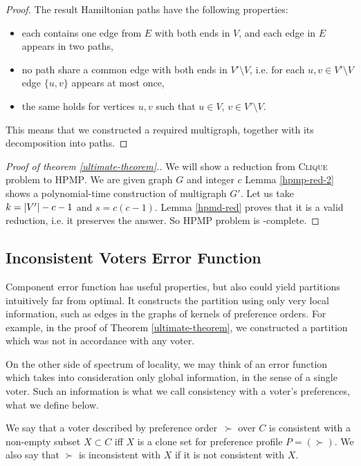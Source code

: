 \begin{proof}
The result Hamiltonian paths have the following properties:
\begin{itemize}
\item each contains one edge from $E$ with both ends in $V$,
  and each edge in $E$ appears in two paths,
\item no path share a common edge with both ends in $V' \setminus V$,
  i.e. for each $u,v \in V' \setminus V$ edge $\{u,v\}$ appears at most once,
\item the same holds for vertices $u,v$ such that $u \in V$, $v \in V' \setminus V$.
\end{itemize}
This means that we constructed a required multigraph, together with its decomposition into paths.
\end{proof}

\begin{proof}[Proof of theorem \ref{ultimate-theorem}.]
We will show a reduction from \textsc{Clique} problem to \textsc{HPMP}.
We are given graph $G$ and integer $c$
Lemma \ref{hpmp-red-2} shows a polynomial-time construction of multigraph $G'$.
Let us take $k=\left\vert V' \right\vert-c-1$ and $s=c(c-1)$.
Lemma \ref{hpmd-red} proves that it is a valid reduction, i.e. it preserves the answer.
So \textsc{HPMP} problem is \np-complete.
\end{proof}


\subsection{Inconsistent Voters Error Function}

Component error function has useful properties, but also could yield partitions
intuitively far from optimal.
It constructs the partition using only very local information,
such as edges in the graphs of kernels of preference orders.
For example, in the proof of Theorem \ref{ultimate-theorem}, we constructed a partition
which was not in accordance with any voter.

On the other side of spectrum of locality, we may think of an error function which
takes into consideration only global information, in the sense of a single voter.
Such an information is what we call consistency with a voter's preferences, what we define below.

\begin{defn}
We say that a voter described by preference order~$\succ$ over $C$
is consistent with a non-empty subset $X \subset C$
iff $X$ is a clone set for preference profile $P = (\succ)$.
We also say that $\succ$ is inconsistent with $X$ if it is not consistent with $X$.
\end{defn}

